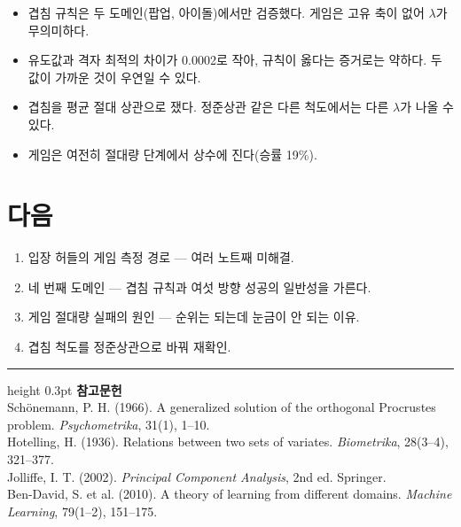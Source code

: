 \documentclass[10pt]{article}
\begin{document}
\begin{itemize}[leftmargin=1.1em,itemsep=0.15em]
\item 겹침 규칙은 두 도메인(팝업, 아이돌)에서만 검증했다. 게임은 고유 축이 없어
      $\lambda$가 무의미하다.
\item 유도값과 격자 최적의 차이가 0.0002로 작아, 규칙이 옳다는 증거로는 약하다.
      두 값이 가까운 것이 우연일 수 있다.
\item 겹침을 평균 절대 상관으로 쟀다. 정준상관 같은 다른 척도에서는 다른 $\lambda$가
      나올 수 있다.
\item 게임은 여전히 절대량 단계에서 상수에 진다(승률 19\%).
\end{itemize}

\section{다음}

\begin{enumerate}[leftmargin=1.3em,itemsep=0.15em]
\item 입장 허들의 게임 측정 경로 --- 여러 노트째 미해결.
\item 네 번째 도메인 --- 겹침 규칙과 여섯 방향 성공의 일반성을 가른다.
\item 게임 절대량 실패의 원인 --- 순위는 되는데 눈금이 안 되는 이유.
\item 겹침 척도를 정준상관으로 바꿔 재확인.
\end{enumerate}

\vspace{0.6em}
\hrule height 0.3pt
\vspace{0.5em}
{\footnotesize
\textbf{참고문헌}\\[0.3em]
Schönemann, P. H. (1966). A generalized solution of the orthogonal Procrustes
problem. \emph{Psychometrika}, 31(1), 1--10.\\[0.15em]
Hotelling, H. (1936). Relations between two sets of variates.
\emph{Biometrika}, 28(3--4), 321--377.\\[0.15em]
Jolliffe, I. T. (2002). \emph{Principal Component Analysis}, 2nd ed. Springer.\\[0.15em]
Ben-David, S. et al. (2010). A theory of learning from different domains.
\emph{Machine Learning}, 79(1--2), 151--175.
}
\end{document}
